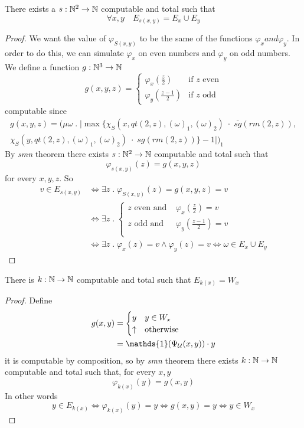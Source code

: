 \begin{proposition}
  There exists a $s:\mathbb{N}^2 \rightarrow \mathbb{N}$ computable and total such that
\[\forall x,y \quad E_{s(x,y)} = E_x \cup E_y\]
\begin{proof}
  We want the value of $\varphi_{S(x,y)}$ to be the same of the
  functions $\varphi_x and \varphi_y$. In order to do this, we can simulate
  $\varphi_x$ on even numbers and $\varphi_y$ on odd numbers. We
  define a function $g : \mathbb{N}^3 \to \mathbb{N}$
  \[
    g(x,y,z) = \begin{cases}
      \varphi_x(\frac{z}{2}) & \mbox{if } z \mbox{ even} \\
      \varphi_y(\frac{z-1}{2}) & \mbox{if } z \mbox{ odd}
    \end{cases}
  \]
  computable since
  \begin{multline*}
    g(x,y,z) = (\mu \omega \; . \; |\max\{\chi_S(x,qt(2,z),(\omega)_1,(\omega)_2) \; \cdot \; \overline{sg}(rm(2,z)), \\ \chi_S(y,qt(2,z),(\omega)_1, (\omega)_2) \; \cdot \; sg(rm(2,z))\}- 1|)_1
  \end{multline*}
  By \emph{smn} theorem there exists $s: \mathbb{N}^2 \rightarrow \mathbb{N}$
  computable and total such that \[\varphi_{s(x,y)}(z) = g(x,y,z)\] for every $x,y,z$.
  So
  \[
    \begin{split}
      v \in E_{s(x,y)} & \Leftrightarrow \exists z \; . \; \varphi_{S(x,y)}(z) = g(x,y,z) = v \\
      & \Leftrightarrow \exists z \; . \; \begin{cases}
        z \mbox{ even and } & \varphi_x(\frac{z}{2}) = v \\
        z \mbox{ odd and } & \varphi_y(\frac{z-1}{2}) = v \\
      \end{cases} \\
      & \Leftrightarrow \exists z \; . \; \varphi_x(z) = v \wedge
      \varphi_y(z) = v \Leftrightarrow \omega \in E_x \cup E_y
    \end{split}
  \]
\end{proof}
\end{proposition}

\begin{proposition}
  There is $k : \mathbb{N} \to \mathbb{N}$ computable and total such that $E_{k(x)} = W_x$
\begin{proof}
  Define
  \begin{align*}
    g(x,y) &= \begin{cases}
      y & y \in W_x \\
      \uparrow & \mbox{otherwise}
    \end{cases} \\
    &= \mathds{1}( \univ (x,y)) \cdot y
  \end{align*}
  it is computable by composition, so by \emph{smn} theorem there exists $k : \mathbb{N} \to \mathbb{N}$
  computable and total such that, for every $x,y$
  \[\varphi_{k(x)}(y) = g(x,y)\]
  In other words
  \[y \in E_{k(x)} \Leftrightarrow \varphi_{k(x)}(y) = y
    \Leftrightarrow g(x,y) = y  \Leftrightarrow y \in W_x\]
\end{proof}
\end{proposition}

